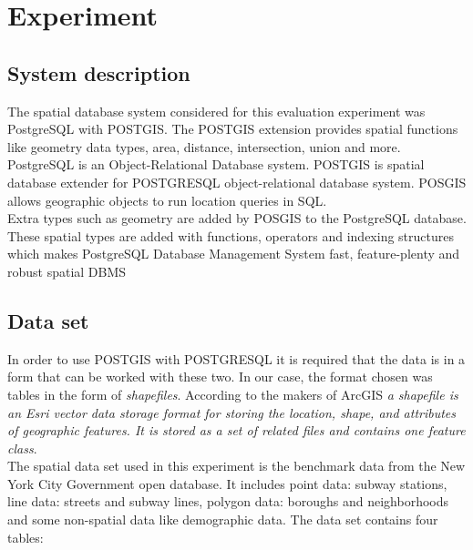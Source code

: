 \documentclass{sig-alternate-05-2015}
\begin{document}
\section{Experiment}
\subsection{System description}
The spatial database system considered for this evaluation experiment was PostgreSQL with POSTGIS. The POSTGIS extension provides spatial functions like geometry data types, area, distance, intersection, union and more.\\
PostgreSQL is an Object-Relational Database system. POSTGIS is spatial database extender for POSTGRESQL object-relational database system. POSGIS allows geographic objects to run location queries in SQL.\\
Extra types such as geometry are added by POSGIS to the PostgreSQL database. These spatial types are added with functions, operators and indexing structures which makes PostgreSQL Database Management System fast, feature-plenty and robust spatial DBMS

\subsection{Data set}
In order to use POSTGIS with POSTGRESQL it is required that the data is in a form that can be worked with these two. In our case, the format chosen was tables in the form of \textit{shapefiles}. According to the makers of ArcGIS \textit{a shapefile is an Esri vector data storage format for storing the location, shape, and attributes of geographic features. It is stored as a set of related files and contains one feature class}.\\

The spatial data set used in this experiment is the benchmark data from the New York City Government open database. It includes point data: subway stations, line data: streets and subway lines, polygon data: boroughs and neighborhoods and some non-spatial data like demographic data. The data set contains four tables:\\
\end{document}
